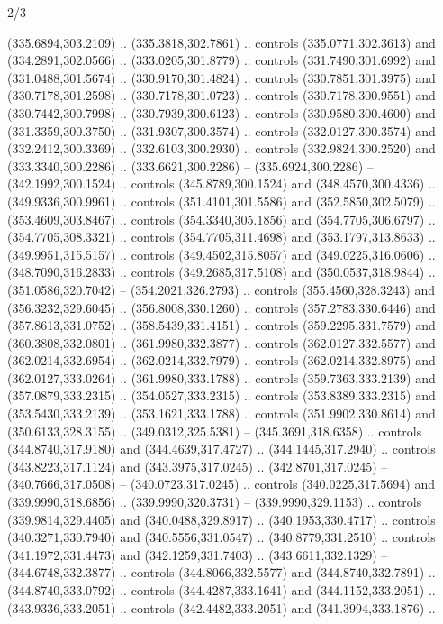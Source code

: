 \begin{flagdescription}{2/3}
\begin{scope}[xshift=0.5\flaglength,yshift=0.5\flagwidth,scale=\flagwidth/311.22]
\begin{scope}[y=0.8pt, x=0.8pt, yscale=-1,shift={(-291.77,-194.51)}]
  (335.6894,303.2109) .. (335.3818,302.7861) .. controls (335.0771,302.3613) and
  (334.2891,302.0566) .. (333.0205,301.8779) .. controls (331.7490,301.6992) and
  (331.0488,301.5674) .. (330.9170,301.4824) .. controls (330.7851,301.3975) and
  (330.7178,301.2598) .. (330.7178,301.0723) .. controls (330.7178,300.9551) and
  (330.7442,300.7998) .. (330.7939,300.6123) .. controls (330.9580,300.4600) and
  (331.3359,300.3750) .. (331.9307,300.3574) .. controls (332.0127,300.3574) and
  (332.2412,300.3369) .. (332.6103,300.2930) .. controls (332.9824,300.2520) and
  (333.3340,300.2286) .. (333.6621,300.2286) -- (335.6924,300.2286) --
  (342.1992,300.1524) .. controls (345.8789,300.1524) and (348.4570,300.4336) ..
  (349.9336,300.9961) .. controls (351.4101,301.5586) and (352.5850,302.5079) ..
  (353.4609,303.8467) .. controls (354.3340,305.1856) and (354.7705,306.6797) ..
  (354.7705,308.3321) .. controls (354.7705,311.4698) and (353.1797,313.8633) ..
  (349.9951,315.5157) .. controls (349.4502,315.8057) and (349.0225,316.0606) ..
  (348.7090,316.2833) .. controls (349.2685,317.5108) and (350.0537,318.9844) ..
  (351.0586,320.7042) -- (354.2021,326.2793) .. controls (355.4560,328.3243) and
  (356.3232,329.6045) .. (356.8008,330.1260) .. controls (357.2783,330.6446) and
  (357.8613,331.0752) .. (358.5439,331.4151) .. controls (359.2295,331.7579) and
  (360.3808,332.0801) .. (361.9980,332.3877) .. controls (362.0127,332.5577) and
  (362.0214,332.6954) .. (362.0214,332.7979) .. controls (362.0214,332.8975) and
  (362.0127,333.0264) .. (361.9980,333.1788) .. controls (359.7363,333.2139) and
  (357.0879,333.2315) .. (354.0527,333.2315) .. controls (353.8389,333.2315) and
  (353.5430,333.2139) .. (353.1621,333.1788) .. controls (351.9902,330.8614) and
  (350.6133,328.3155) .. (349.0312,325.5381) -- (345.3691,318.6358) .. controls
  (344.8740,317.9180) and (344.4639,317.4727) .. (344.1445,317.2940) .. controls
  (343.8223,317.1124) and (343.3975,317.0245) .. (342.8701,317.0245) --
  (340.7666,317.0508) -- (340.0723,317.0245) .. controls (340.0225,317.5694) and
  (339.9990,318.6856) .. (339.9990,320.3731) -- (339.9990,329.1153) .. controls
  (339.9814,329.4405) and (340.0488,329.8917) .. (340.1953,330.4717) .. controls
  (340.3271,330.7940) and (340.5556,331.0547) .. (340.8779,331.2510) .. controls
  (341.1972,331.4473) and (342.1259,331.7403) .. (343.6611,332.1329) --
  (344.6748,332.3877) .. controls (344.8066,332.5577) and (344.8740,332.7891) ..
  (344.8740,333.0792) .. controls (344.4287,333.1641) and (344.1152,333.2051) ..
  (343.9336,333.2051) .. controls (342.4482,333.2051) and (341.3994,333.1876) ..

\end{scope}
\end{scope}
\end{flagdescription}
